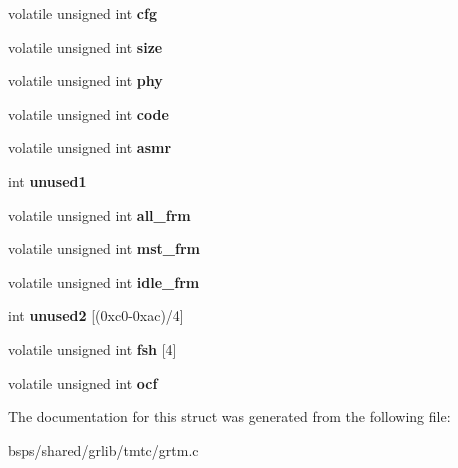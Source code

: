 \begin{DoxyCompactItemize}
\mbox{\label{structgrtm__regs_a590341e1dcd3e7572cfc974b3b6d39c5}} 
volatile unsigned int {\bfseries cfg}
\item 
\mbox{\label{structgrtm__regs_acfa9e21f3e7b61b9be4bf87898271226}} 
volatile unsigned int {\bfseries size}
\item 
\mbox{\label{structgrtm__regs_a78275dac08e6821fa0eab81b82c801ec}} 
volatile unsigned int {\bfseries phy}
\item 
\mbox{\label{structgrtm__regs_ab57711d632d5c3bba443d4b6a025498b}} 
volatile unsigned int {\bfseries code}
\item 
\mbox{\label{structgrtm__regs_ab213384118d527cd4d1dc67b9bf87dc4}} 
volatile unsigned int {\bfseries asmr}
\item 
\mbox{\label{structgrtm__regs_a0a3d4003eaa693f069ac94c876d349c1}} 
int {\bfseries unused1}
\item 
\mbox{\label{structgrtm__regs_a16f024739c5932e1852279c37503811d}} 
volatile unsigned int {\bfseries all\+\_\+frm}
\item 
\mbox{\label{structgrtm__regs_af6a72dab4aedfdfbbbfc15ae911744f8}} 
volatile unsigned int {\bfseries mst\+\_\+frm}
\item 
\mbox{\label{structgrtm__regs_a05fbd9f11da2a1ff0d788b2d21b74230}} 
volatile unsigned int {\bfseries idle\+\_\+frm}
\item 
\mbox{\label{structgrtm__regs_a0e0b1fc497d5f6a2b1b66524ca320275}} 
int {\bfseries unused2} \mbox{[}(0xc0-\/0xac)/4\mbox{]}
\item 
\mbox{\label{structgrtm__regs_abd428edf5bcae7213df5cc5b3297eaf1}} 
volatile unsigned int {\bfseries fsh} \mbox{[}4\mbox{]}
\item 
\mbox{\label{structgrtm__regs_a5721d029a0a837a52a8f633887f75985}} 
volatile unsigned int {\bfseries ocf}
\end{DoxyCompactItemize}


The documentation for this struct was generated from the following file\+:\begin{DoxyCompactItemize}
\item 
bsps/shared/grlib/tmtc/grtm.\+c\end{DoxyCompactItemize}
